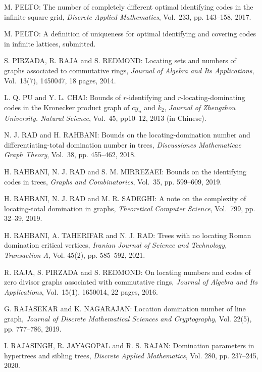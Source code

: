 \begin{thebibliography}{999}
M. PELTO: The number of completely different optimal identifying codes in the infinite square grid, {\it Discrete Applied Mathematics}, Vol.~233, pp. 143--158,  2017.

M. PELTO: A definition of uniqueness for optimal identifying and covering codes in infinite lattices, submitted.

S. PIRZADA, R. RAJA and S. REDMOND: Locating sets and numbers of graphs associated to commutative rings, {\it Journal of Algebra and Its Applications}, Vol.~13(7), 1450047, 18 pages, 2014.

L. Q. PU and Y. L. CHAI: Bounds of $r$-identifying and $r$-locating-dominating codes in the Kronecker product graph of $cy_n$ and $\bar{k}_2$, {\it Journal of Zhengzhou University. Natural Science}, Vol.~45, pp10--12, 2013 (in Chinese).

N. J. RAD and H. RAHBANI: Bounds on the locating-domination number and differentiating-total domination number in trees, {\it Discussiones Mathematicae Graph Theory}, Vol.~38, pp. 455--462, 2018.

H. RAHBANI, N. J. RAD and S. M. MIRREZAEI: Bounds on the identifying codes in trees, {\it Graphs and Combinatorics}, Vol.~35, pp. 599--609, 2019.

H. RAHBANI, N. J. RAD and M. R. SADEGHI: A note on the complexity of locating-total domination in graphs, {\it Theoretical Computer Science}, Vol.~799, pp. 32--39, 2019.

H. RAHBANI, A. TAHERIFAR and N. J. RAD: Trees with no locating Roman domination critical vertices, {\it Iranian Journal of Science and Technology, Transaction A}, Vol. 45(2), pp. 585--592, 2021.

R. RAJA, S. PIRZADA and S. REDMOND: On locating numbers and codes of zero divisor graphs associated with commutative rings, {\it Journal of Algebra and Its Applications}, Vol.~15(1), 1650014, 22 pages, 2016.

G. RAJASEKAR and K. NAGARAJAN: Location domination number of line graph, {\it Journal of Discrete Mathematical Sciences and Cryptography}, Vol. 22(5), pp. 777--786, 2019.

I. RAJASINGH, R. JAYAGOPAL and R. S. RAJAN: Domination parameters in hypertrees and sibling trees, {\it Discrete Applied Mathematics}, Vol. 280, pp. 237--245, 2020.


\end{thebibliography}
